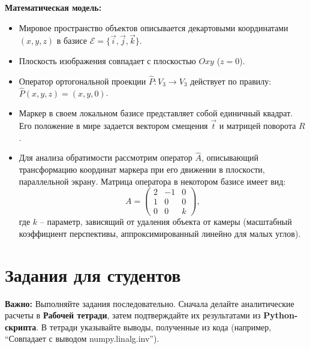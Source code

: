 \documentclass[a4paper,12pt]{article}
\begin{document}
\medskip
\noindent\textbf{Математическая модель:}
\begin{itemize}[label=$\bullet$]
    \item Мировое пространство объектов описывается декартовыми координатами $(x, y, z)$ в базисе $\mathcal{E} = \{\vec{i}, \vec{j}, \vec{k}\}$.
    \item Плоскость изображения совпадает с плоскостью $Oxy$ ($z=0$).
    \item Оператор ортогональной проекции $\hat{P}: V_3 \to V_3$ действует по правилу: $\hat{P}(x, y, z) = (x, y, 0)$.
    \item Маркер в своем локальном базисе представляет собой единичный квадрат. Его положение в мире задается вектором смещения $\vec{t}$ и матрицей поворота $R$.
    \item Для анализа обратимости рассмотрим оператор $\hat{A}$, описывающий трансформацию координат маркера при его движении в плоскости, параллельной экрану. Матрица оператора в некотором базисе имеет вид:
    \[
    A = \begin{pmatrix} 
    2 & -1 & 0 \\ 
    1 & 0 & 0 \\ 
    0 & 0 & k 
    \end{pmatrix},
    \]
    где $k$ -- параметр, зависящий от удаления объекта от камеры (масштабный коэффициент перспективы, аппроксимированный линейно для малых углов).
\end{itemize}

\section{Задания для студентов}

\begin{instructionbox}
\textbf{Важно:} Выполняйте задания последовательно. Сначала делайте аналитические расчеты в \textbf{Рабочей тетради}, затем подтверждайте их результатами из \textbf{Python-скрипта}. В тетради указывайте выводы, полученные из кода (например, ``Совпадает с выводом numpy.linalg.inv'').
\end{instructionbox}
\end{document}

